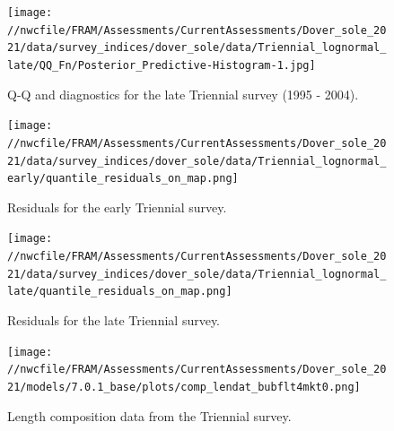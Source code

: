 \documentclass[11pt,
  english,
  a4paper,
]{article}
\begin{document}

\begin{figure}
\centering
\texttt{[image: //nwcfile/FRAM/Assessments/CurrentAssessments/Dover\_sole\_2021/data/survey\_indices/dover\_sole/data/Triennial\_lognormal\_late/QQ\_Fn/Posterior\_Predictive-Histogram-1.jpg]}
\caption{Q-Q and diagnostics for the late Triennial survey (1995 - 2004).\label{fig:tri-late-qq}}
\end{figure}

\tagmcend\tagstructend

\newpage


\begin{figure}
\centering
\texttt{[image: //nwcfile/FRAM/Assessments/CurrentAssessments/Dover\_sole\_2021/data/survey\_indices/dover\_sole/data/Triennial\_lognormal\_early/quantile\_residuals\_on\_map.png]}
\caption{Residuals for the early Triennial survey.\label{fig:tri-early-resid}}
\end{figure}

\tagmcend\tagstructend


\begin{figure}
\centering
\texttt{[image: //nwcfile/FRAM/Assessments/CurrentAssessments/Dover\_sole\_2021/data/survey\_indices/dover\_sole/data/Triennial\_lognormal\_late/quantile\_residuals\_on\_map.png]}
\caption{Residuals for the late Triennial survey.\label{fig:tri-late-resid}}
\end{figure}

\tagmcend\tagstructend

\newpage


\begin{figure}
\centering
\texttt{[image: //nwcfile/FRAM/Assessments/CurrentAssessments/Dover\_sole\_2021/models/7.0.1\_base/plots/comp\_lendat\_bubflt4mkt0.png]}
\caption{Length composition data from the Triennial survey.\label{fig:tri-len-data}}
\end{figure}

\tagmcend\tagstructend
\end{document}
